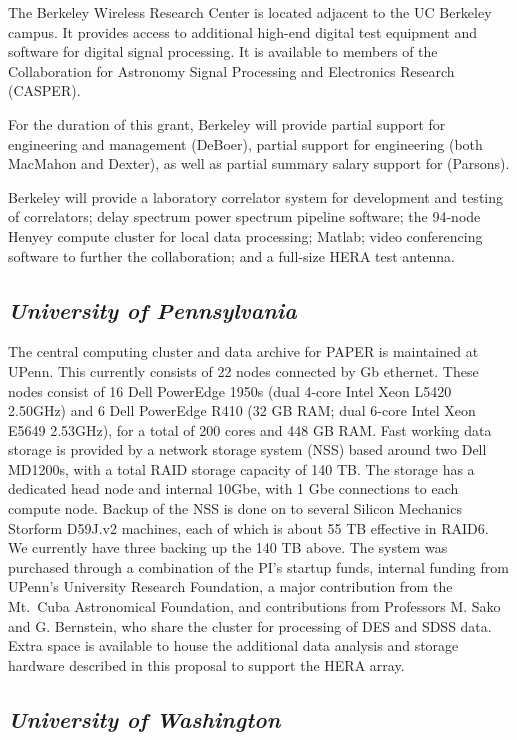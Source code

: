 \documentclass[11pt]{article}
\begin{document}
The Berkeley Wireless Research Center is located adjacent to the UC Berkeley
campus. It provides access to additional high-end digital test equipment and
software for digital signal processing.  It is available to members of the
Collaboration for Astronomy Signal Processing and Electronics Research (CASPER).

For the duration of this grant, Berkeley will provide partial support for engineering and management (DeBoer), 
partial support for engineering (both MacMahon and Dexter),
as well as partial summary salary support for (Parsons).

Berkeley will provide a laboratory correlator system for development and
testing of correlators; delay spectrum power spectrum pipeline software; the
94-node Henyey compute cluster for local data processing; Matlab; video
conferencing software to further the collaboration; and a full-size HERA test
antenna.

\subsection*{\it University of Pennsylvania}

The central computing cluster and data archive for PAPER
is maintained at UPenn.  This currently consists of 22 nodes connected by Gb
ethernet. These nodes consist of 16 Dell PowerEdge 1950s (dual 4-core Intel Xeon L5420 \@ 2.50GHz)
and 6 Dell PowerEdge R410 (32 GB RAM; dual 6-core Intel Xeon E5649 \@ 2.53GHz),
for a total of 200 cores and 448 GB RAM.  Fast working data storage is provided
by a network storage system (NSS) based around two Dell MD1200s, with a total
RAID storage capacity of 140 TB.  The storage has a dedicated head node and internal
10Gbe, with 1 Gbe connections to each compute node. Backup of the NSS is done
on to several Silicon Mechanics Storform D59J.v2 machines, each of which is
about 55 TB effective in RAID6.  We currently have three backing up the 140 TB
above. The system was purchased through a combination of the PI's startup
funds, internal funding from UPenn's University Research Foundation, a major
contribution from the Mt.~Cuba Astronomical Foundation, and contributions from
Professors M. Sako and G. Bernstein, who share the cluster for processing of
DES and SDSS data.  Extra space is available to house the additional data
analysis and storage hardware described in this proposal to support the HERA
array.


\subsection*{\it University of Washington}
\end{document}

